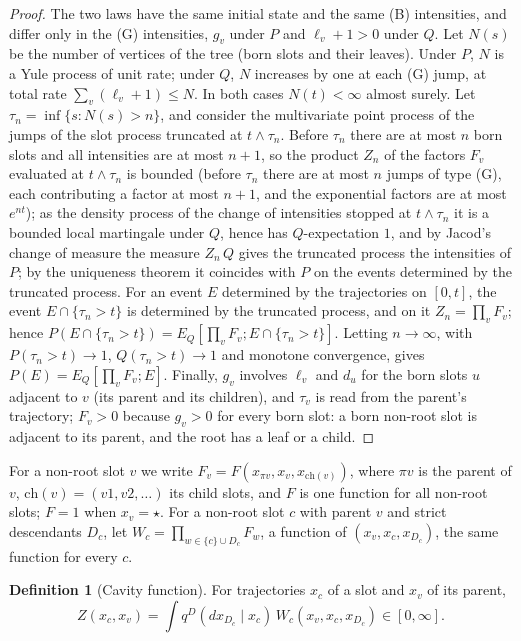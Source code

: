 \documentclass[11pt]{article}
\theoremstyle{plain}
\theoremstyle{definition}
\newtheorem{definition}[theorem]{Definition}
\theoremstyle{remark}
\begin{document}
\begin{proof}
The two laws have the same initial state and the same (B) intensities, and differ only in the (G) intensities, $g_v$ under $P$ and $\ell_v+1>0$ under $Q$. Let $N(s)$ be the number of vertices of the tree (born slots and their leaves). Under $P$, $N$ is a Yule process of unit rate; under $Q$, $N$ increases by one at each (G) jump, at total rate $\sum_v(\ell_v+1)\le N$. In both cases $N(t)<\infty$ almost surely. Let $\tau_n=\inf\{s:N(s)>n\}$, and consider the multivariate point process of the jumps of the slot process truncated at $t\wedge\tau_n$. Before $\tau_n$ there are at most $n$ born slots and all intensities are at most $n+1$, so the product $Z_n$ of the factors $F_v$ evaluated at $t\wedge\tau_n$ is bounded (before $\tau_n$ there are at most $n$ jumps of type (G), each contributing a factor at most $n+1$, and the exponential factors are at most $e^{nt}$); as the density process of the change of intensities stopped at $t\wedge\tau_n$ it is a bounded local martingale under $Q$, hence has $Q$-expectation $1$, and by Jacod's change of measure \cite[Theorem~(4.5)]{Jacod1975} the measure $Z_n\,Q$ gives the truncated process the intensities of $P$; by the uniqueness theorem \cite[Theorem~(3.4)]{Jacod1975} it coincides with $P$ on the events determined by the truncated process. For an event $E$ determined by the trajectories on $[0,t]$, the event $E\cap\{\tau_n>t\}$ is determined by the truncated process, and on it $Z_n=\prod_vF_v$; hence $P(E\cap\{\tau_n>t\})=E_Q[\prod_vF_v;E\cap\{\tau_n>t\}]$. Letting $n\to\infty$, with $P(\tau_n>t)\to1$, $Q(\tau_n>t)\to1$ and monotone convergence, gives $P(E)=E_Q[\prod_vF_v;E]$. Finally, $g_v$ involves $\ell_v$ and $d_u$ for the born slots $u$ adjacent to $v$ (its parent and its children), and $\tau_v$ is read from the parent's trajectory; $F_v>0$ because $g_v>0$ for every born slot: a born non-root slot is adjacent to its parent, and the root has a leaf or a child.
\end{proof}

For a non-root slot $v$ we write $F_v=F(x_{\pi v},x_v,x_{\mathrm{ch}(v)})$, where $\pi v$ is the parent of $v$, $\mathrm{ch}(v)=(v1,v2,\dots)$ its child slots, and $F$ is one function for all non-root slots; $F=1$ when $x_v=\star$. For a non-root slot $c$ with parent $v$ and strict descendants $D_c$, let $W_c=\prod_{w\in\{c\}\cup D_c}F_w$, a function of $(x_v,x_c,x_{D_c})$, the same function for every $c$.

\begin{definition}[Cavity function]\label{def:cavity}
For trajectories $x_c$ of a slot and $x_v$ of its parent,
\[
Z(x_c,x_v)=\int q^D(dx_{D_c}\mid x_c)\,W_c(x_v,x_c,x_{D_c})\in[0,\infty].
\]
\end{definition}
\end{document}
